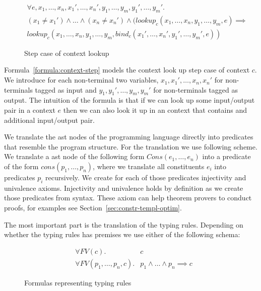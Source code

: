 \begin{figure}
\begin{multline}
  \forall e, x_1, \dots, x_n, x_1', \dots, x_n', y_1, \dots, y_m,
  y_1', \dots,
  y_m' . \\
  (x_1 \neq x_1') \land \dots \land (x_n \neq x_n') \land (lookup_c(x_1,
  \dots, x_n, y_1, \dots, y_m, e) \implies \\ lookup_c(x_1, \dots, x_n,
  y_1, \dots, y_m, bind_c(x_1',\dots,x_n',y_1',\dots,y_m',e))
\label{formula:context-step}
\end{multline}
\caption{Step case of context lookup}
\end{figure}

Formula~\ref{formula:context-step} models the context look up step
case of context $c$. We introduce for each non-terminal two variables,
$x_1,x_1', \dots, x_n,x_n'$ for non-terminals tagged as input and
$y_1,y_1', \dots, y_m,y_m'$ for non-terminals tagged as output. The
intuition of the formula is that if we can look up some input/output
pair in a context $e$ then we can also look it up in an context that
contains and additional input/output pair.

We translate the \gls{ast} nodes of the programming language directly
into predicates that resemble the program structure. For the
translation we use following scheme. We translate a \gls{ast} node of
the following form $Cons(e_1, \dots, e_n)$ into a predicate of the
form $cons(p_1, \dots, p_n)$, where we translate all constituents
$e_i$ into predicates $p_i$ recursively. We create for each of those
predicates injectivity and univalence axioms. Injectivity and
univalence holds by definition as we create those predicates from
syntax. These axiom can help theorem provers to conduct proofs, for
examples see Section~\ref{sec:constr-templ-optim}.

The most important part is the translation of the typing
rules. Depending on whether the typing rules has premises we use
either of the following schema:

\begin{figure}
\begin{align}
  &\forall FV(c) .& c \\
  &\forall FV(p_1,\dots, p_n, c) .& p_1 \land \dots \land p_n \implies
  c
\label{formula:typing-rule}
\end{align}
\caption{Formulas representing typing rules}
\end{figure}

